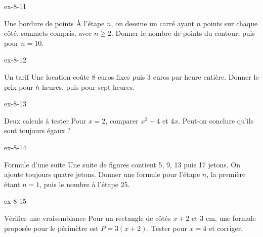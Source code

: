 \begin{blocLivre}{ex-8-11}\begin{exercice}[3]{Une bordure de points}
À l’étape $n$, on dessine un carré ayant $n$ points sur chaque côté, sommets compris, avec $n\ge2$. Donner le nombre de points du contour, puis pour $n=10$.
\label{fig-ex-8-11}
\end{exercice}\end{blocLivre}
\begin{blocLivre}{ex-8-12}\begin{exercice}[3]{Un tarif}
Une location coûte 8 euros fixes puis 3 euros par heure entière. Donner le prix pour $h$ heures, puis pour sept heures.
\end{exercice}\end{blocLivre}
\begin{blocLivre}{ex-8-13}\begin{exercice}[3]{Deux calculs à tester}
Pour $x=2$, comparer $x^2+4$ et $4x$. Peut-on conclure qu’ils sont toujours égaux ?
\end{exercice}\end{blocLivre}
\begin{blocLivre}{ex-8-14}\begin{exercice}[3]{Formule d’une suite}
Une suite de figures contient 5, 9, 13 puis 17 jetons. On ajoute toujours quatre jetons. Donner une formule pour l’étape $n$, la première étant $n=1$, puis le nombre à l’étape 25.
\end{exercice}\end{blocLivre}
\begin{blocLivre}{ex-8-15}\begin{exercice}[3]{Vérifier une vraisemblance}
Pour un rectangle de côtés $x+2$ et 3 cm, une formule proposée pour le périmètre est $P=3(x+2)$. Tester pour $x=4$ et corriger.
\label{fig-ex-8-15}
\end{exercice}\end{blocLivre}

\clearpage
